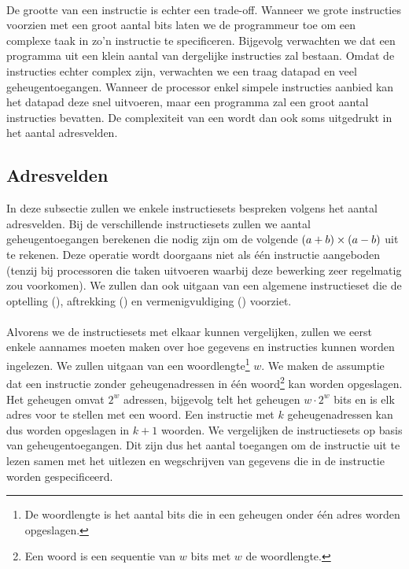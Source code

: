 \paragraph{}
De grootte van een instructie is echter een trade-off. Wanneer we grote instructies voorzien met een groot aantal bits laten we de programmeur toe om een complexe taak in zo'n instructie te specificeren. Bijgevolg verwachten we dat een programma uit een klein aantal van dergelijke instructies zal bestaan. Omdat de instructies echter complex zijn, verwachten we een traag datapad en veel geheugentoegangen. Wanneer de processor enkel simpele instructies aanbied kan het datapad deze snel uitvoeren, maar een programma zal een groot aantal instructies bevatten. De complexiteit van een  wordt dan ook soms uitgedrukt in het aantal adresvelden.
\subsection{Adresvelden}
In deze subsectie zullen we enkele instructiesets bespreken volgens het aantal adresvelden. Bij de verschillende instructiesets zullen we aantal geheugentoegangen berekenen die nodig zijn om de volgende $\left( a+b \right)\times\left( a-b \right)$ uit te rekenen. Deze operatie wordt doorgaans niet als \'e\'en instructie aangeboden (tenzij bij processoren die taken uitvoeren waarbij deze bewerking zeer regelmatig zou voorkomen). We zullen dan ook uitgaan van een algemene instructieset die de optelling (), aftrekking () en vermenigvuldiging () voorziet.
\paragraph{}
Alvorens we de instructiesets met elkaar kunnen vergelijken, zullen we eerst enkele aannames moeten maken over hoe gegevens en instructies kunnen worden ingelezen. We zullen uitgaan van een woordlengte\footnote{De woordlengte is het aantal bits die in een geheugen onder \'e\'en adres worden opgeslagen.} $w$. We maken de assumptie dat een instructie zonder geheugenadressen in \'e\'en woord\footnote{Een woord is een sequentie van $w$ bits met $w$ de woordlengte.} kan worden opgeslagen. Het geheugen omvat $2^w$ adressen, bijgevolg telt het geheugen $w\cdot 2^w$ bits en is elk adres voor te stellen met een woord. Een instructie met $k$ geheugenadressen kan dus worden opgeslagen in $k+1$ woorden. We vergelijken de instructiesets op basis van geheugentoegangen. Dit zijn dus het aantal toegangen om de instructie uit te lezen samen met het uitlezen en wegschrijven van gegevens die in de instructie worden gespecificeerd.
